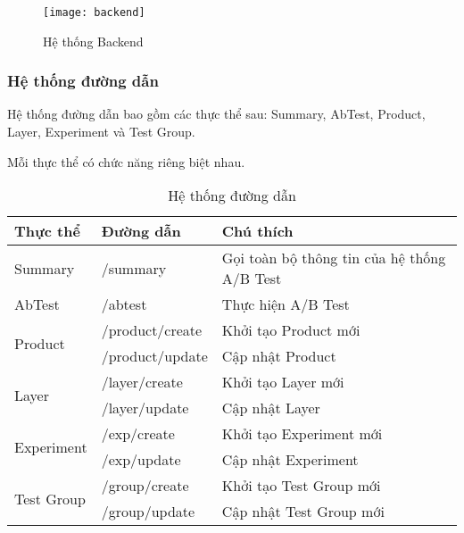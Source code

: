 \begin{figure}[ht]
	\centering
	\texttt{[image: backend]}
	\caption{Hệ thống Backend}
\end{figure}

\subsubsection{Hệ thống đường dẫn}

Hệ thống đường dẫn bao gồm các thực thể sau: Summary, AbTest, Product, Layer, Experiment và Test Group.

Mỗi thực thể có chức năng riêng biệt nhau.

\begin{table}[h!]
	\centering
	\begin{tabular}{|l|l|l|}
		\hline
		\textbf{Thực thể}           & \textbf{Đường dẫn} & \textbf{Chú thích}                          \\ \hline
		Summary                     & /summary           & Gọi toàn bộ thông tin của hệ thống A/B Test \\ \hline
		AbTest                      & /abtest            & Thực hiện A/B Test                          \\ \hline
		\multirow{2}{*}{Product}    & /product/create    & Khởi tạo Product mới                        \\ \cline{2-3}
		                            & /product/update    & Cập nhật Product                            \\ \hline
		\multirow{2}{*}{Layer}      & /layer/create      & Khởi tạo Layer mới                          \\ \cline{2-3}
		                            & /layer/update      & Cập nhật Layer                              \\ \hline
		\multirow{2}{*}{Experiment} & /exp/create        & Khởi tạo Experiment mới                     \\ \cline{2-3}
		                            & /exp/update        & Cập nhật Experiment                         \\ \hline
		\multirow{2}{*}{Test Group} & /group/create      & Khởi tạo Test Group mới                     \\ \cline{2-3}
		                            & /group/update      & Cập nhật Test Group mới                     \\ \hline
	\end{tabular}
	\caption{Hệ thống đường dẫn}
\end{table}

